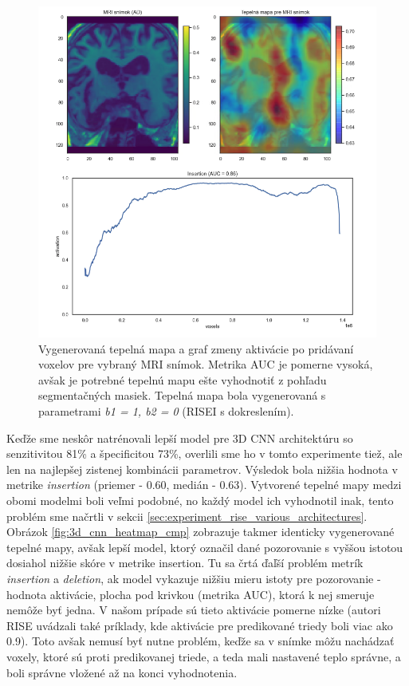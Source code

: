 \begin{figure}[h!]
    \centering
    \includegraphics[width=14cm]{assets/images/heatmap_and_auc_example.png}
    \caption{Vygenerovaná tepelná mapa a graf zmeny aktivácie po pridávaní voxelov pre vybraný MRI snímok. Metrika AUC je pomerne vysoká, avšak je potrebné tepelnú mapu ešte vyhodnotiť z pohľadu segmentačných masiek. Tepelná mapa bola vygenerovaná s parametrami \textit{b1 = 1, b2 = 0} (RISEI s dokreslením).}
    \label{fig:heatmap_and_auc_example}
\end{figure}

Keďže sme neskôr natrénovali lepší model pre 3D CNN architektúru so senzitivitou 81\% a špecificitou 73\%, overlili sme ho v tomto experimente tiež, ale len na najlepšej zistenej kombinácii parametrov. Výsledok bola nižšia hodnota v metrike \textit{insertion} (priemer - 0.60, medián - 0.63). Vytvorené tepelné mapy medzi obomi modelmi boli veľmi podobné, no každý model ich vyhodnotil inak, tento problém sme načrtli v sekcii \ref{sec:experiment_rise_various_architectures}. Obrázok \ref{fig:3d_cnn_heatmap_cmp} zobrazuje takmer identicky vygenerované tepelné mapy, avšak lepší model, ktorý označil dané pozorovanie s vyššou istotou 
dosiahol nižšie skóre v metrike insertion. Tu sa črtá ďaľší problém metrík \textit{insertion} a \textit{deletion}, ak model vykazuje nižšiu mieru istoty pre pozorovanie - hodnota aktivácie, plocha pod krivkou (metrika AUC), ktorá k nej smeruje nemôže byť jedna. V našom prípade sú tieto aktivácie pomerne nízke (autori RISE uvádzali také príklady, kde aktivácie pre predikované triedy boli viac ako 0.9). Toto avšak nemusí byť nutne problém, keďže sa v snímke môžu nachádzať voxely, ktoré sú proti predikovanej triede, a teda mali nastavené teplo správne, a boli správne vložené až na konci vyhodnotenia. 

